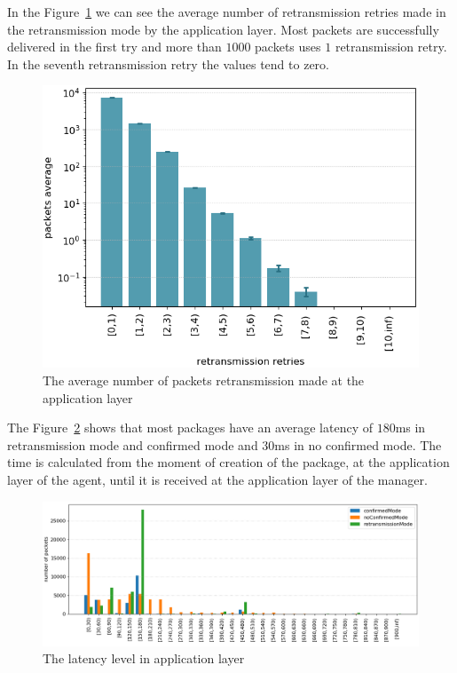 In the Figure~\ref{fig:retransmissionretries} we can see the average number of retransmission retries made in the retransmission mode by the application layer. Most packets are successfully delivered in the first try and more than $1000$ packets uses $1$ retransmission retry. In the seventh retransmission retry the values tend to zero.

\begin{figure}[htbp]
\centerline{\includegraphics[width=\linewidth]{figures/RetransmissionRetries.png}}
\caption{The average number of packets retransmission made at the application layer}
\label{fig:retransmissionretries}
\end{figure}

The Figure~\ref{fig:latency} shows that most packages have an average latency of $180$ms in retransmission mode and confirmed mode and $30$ms in no confirmed mode. 
The time is calculated from the moment of creation of the package, at the application layer of the agent, until it is received at the application layer of the manager.

\begin{figure}[htbp]
\centerline{\includegraphics[width=\linewidth]{figures/Latency.png}}
\caption{The latency level in application layer}
\label{fig:latency}
\end{figure}